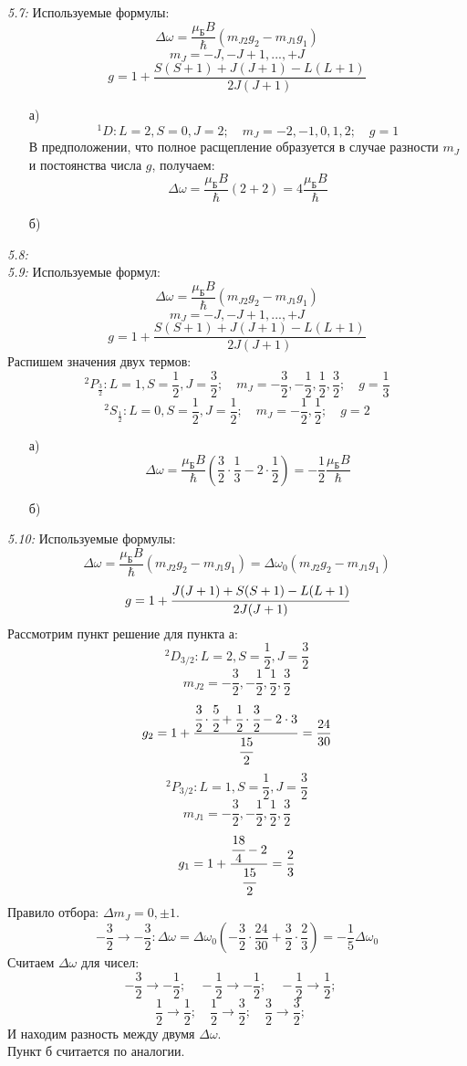 	\emph{5.7: } Используемые формулы: 
		\[ \Delta\omega = \frac{\mu_\text{Б}B}{\hbar}(m_{J2}g_{2}-m_{J1}g_{1}) \]
		\[ m_J = -J, -J+1, ..., +J \]
		\[ g = 1 + \frac{S(S+1)+J(J+1)-L(L+1)}{2J(J+1)} \]
		\begin{itemize}\itemsep-8pt
			\item[а)] 
			\[ 
				^1D: L=2, S=0, J=2;\quad
				m_J = -2, -1, 0, 1, 2;\quad
				g = 1
			\]
			В предположении, что полное расщепление образуется в случае разности
			\( m_J \) и постоянства числа \( g \), получаем:
			\[ 
				\Delta\omega = \frac{\mu_\text{Б}B}{\hbar}(2+2) 
				= 4\frac{\mu_\text{Б}B}{\hbar} 
			\]
			\item[б)]
		\end{itemize}

	\emph{5.8: } \\

	\emph{5.9: } Используемые формул:
		\[ \Delta\omega = \frac{\mu_\text{Б}B}{\hbar}(m_{J2}g_{2}-m_{J1}g_{1}) \]
		\[ m_J = -J, -J+1, ..., +J \]
		\[ g = 1 + \frac{S(S+1)+J(J+1)-L(L+1)}{2J(J+1)} \]
		Распишем значения двух термов:
		\[ 
			^2P_\frac{3}{2}: L = 1, S = \frac{1}{2}, J = \frac{3}{2};\quad
			m_J = -\frac{3}{2}, -\frac{1}{2}, \frac{1}{2}, \frac{3}{2};\quad
			g = \frac{1}{3}
		\]
		\[ 
			^2S_\frac{1}{2}: L = 0, S = \frac{1}{2}, J = \frac{1}{2};\quad
			m_J = -\frac{1}{2}, \frac{1}{2};\quad
			g = 2
		\]
		\begin{itemize}\itemsep-8pt
			\item[а)]
			\[ 
				\Delta\omega = \frac{\mu_\text{Б}B}{\hbar}
				(\frac{3}{2}\cdot\frac{1}{3} - 2\cdot\frac{1}{2}) = 
				-\frac{1}{2}\frac{\mu_\text{Б}B}{\hbar}
			\]
			\item[б)]
		\end{itemize}

	\emph{5.10: } Используемые формулы: 
		\[ 
			\Delta\omega = \frac{\mu_\text{Б}B}{\hbar}(m_{J2}g_2 - m_{J1}g_1)
			= \Delta\omega_0 (m_{J2}g_2 - m_{J1}g_1)
		\]
		\[ g = 1 + \cfrac{J(J+1)+S(S+1)-L(L+1)}{2J(J+1)} \]
		Рассмотрим пункт решение для пункта а:
		\[ ^2D_{3/2}: L=2, S=\frac{1}{2}, J=\frac{3}{2} \]
		\[ m_{J2} = -\frac{3}{2}, -\frac{1}{2}, \frac{1}{2}, \frac{3}{2} \]
		\[ 
			g_2 = 1 + \frac{\cfrac{3}{2}\cdot\cfrac{5}{2} 
			+ \cfrac{1}{2}\cdot\cfrac{3}{2} - 2\cdot3}{\cfrac{15}{2}} 
			= \frac{24}{30}
		\]
		\[ ^2P_{3/2}: L=1, S=\frac{1}{2}, J=\frac{3}{2} \]
		\[ m_{J1} = -\frac{3}{2}, -\frac{1}{2}, \frac{1}{2}, \frac{3}{2} \]
		\[ g_1 = 1 + \frac{\cfrac{18}{4} - 2}{\cfrac{15}{2}} = \frac{2}{3} \]
		Правило отбора: \( \Delta m_J = 0, \pm1 \).
		\[ -\frac{3}{2} \rightarrow -\frac{3}{2}: 
			\Delta\omega = \Delta\omega_0 (-\frac{3}{2}\cdot\frac{24}{30} 
			+ \frac{3}{2}\cdot\frac{2}{3}) = -\frac{1}{5}\Delta\omega_0 
		\]
		Считаем \( \Delta\omega \) для чисел:
		\[ 
			-\frac{3}{2} \rightarrow -\frac{1}{2};\quad
			-\frac{1}{2} \rightarrow -\frac{1}{2};\quad
			-\frac{1}{2} \rightarrow \frac{1}{2};\quad
		\]
		\[ 
			\frac{1}{2} \rightarrow \frac{1}{2};\quad
			\frac{1}{2} \rightarrow \frac{3}{2};\quad
			\frac{3}{2} \rightarrow \frac{3}{2};\quad
		\]
		И находим разность между двумя \( \Delta\omega \). \\
		Пункт б считается по аналогии.

